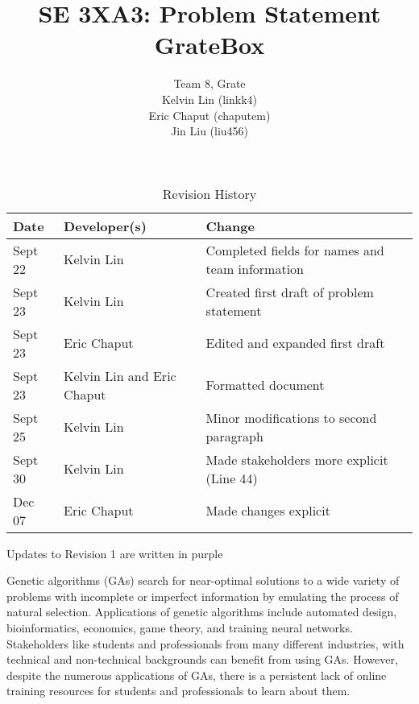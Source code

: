 \documentclass{article}
\title{SE 3XA3: Problem Statement\\GrateBox}
\author{Team 8, Grate
		\\ Kelvin Lin (linkk4)
		\\ Eric Chaput (chaputem)
		\\ Jin Liu (liu456)
}
\date{}
\begin{document}
\begin{table}[hp]
\color{blue}
\caption{Revision History} \label{TblRevisionHistory}
\begin{tabularx}{\textwidth}{llX}
\toprule
\textbf{Date} & \textbf{Developer(s)} & \textbf{Change}\\
\midrule
Sept 22 & Kelvin Lin & Completed fields for names and team information\\
Sept 23 & Kelvin Lin & Created first draft of problem statement\\
Sept 23 & Eric Chaput & Edited and expanded first draft\\
Sept 23 & Kelvin Lin and Eric Chaput& Formatted document\\
Sept 25 & Kelvin Lin & Minor modifications to second paragraph\\
Sept 30 & Kelvin Lin & Made stakeholders more explicit (Line 44)\\
Dec 07 & Eric Chaput & Made changes explicit\\
\bottomrule
\end{tabularx}
\end{table}

\newpage
\color{black}
\maketitle

\textcolor{RoyalPurple}{Updates to Revision 1 are written in purple}

Genetic algorithms (GAs) search for near-optimal solutions to a wide variety of 
problems with incomplete or imperfect information by emulating the process of 
natural selection. Applications of genetic algorithms include automated design, 
bioinformatics, economics, game theory, and training neural networks. 
\textcolor{RoyalPurple}{Stakeholders like students 
and professionals from many different industries, with technical and 
non-technical backgrounds can benefit from using GAs.} However, despite the 
numerous applications of GAs, there is a persistent lack of online training 
resources for students and professionals to learn about them. 
\end{document}
